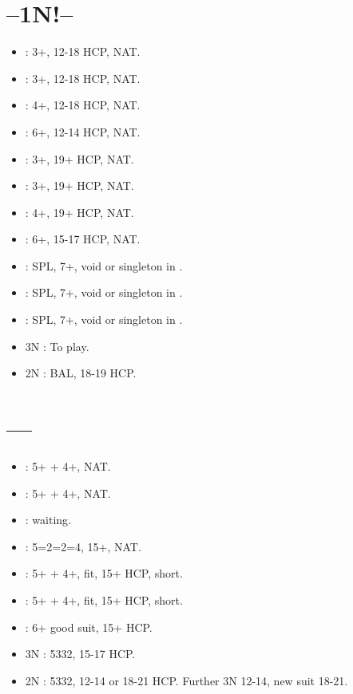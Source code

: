 \documentclass[12pt,twoside,a5paper]{report}%
\begin{document}
	\section*{--1N!--}
	\begin{itemize}
	\renewcommand{\labelitemi}{}
	\item {} : 3+\cl{}, 12-18 HCP, NAT.
	\item {} : 3+\di{}, 12-18 HCP, NAT.
	\item {} : 4+\he{}, 12-18 HCP, NAT.
	\item {} : 6+\sp{}, 12-14 HCP, NAT.
	\item {} : 3+\cl{}, 19+ HCP, NAT.
	\item {} : 3+\di{}, 19+ HCP, NAT.
	\item {} : 4+\he{}, 19+ HCP, NAT.
	\item {} : 6+\sp{}, 15-17 HCP, NAT.
	\item {} : SPL, 7+\sp{}, void or singleton in \cl{}.
	\item {} : SPL, 7+\sp{}, void or singleton in \di{}.
	\item {} : SPL, 7+\sp{}, void or singleton in \he{}.
	\item 3N : To play.
	\item 2N : BAL, 18-19 HCP.
	\end{itemize}

	\section*{----}
	\begin{itemize}
	\renewcommand{\labelitemi}{}
	\item {} : 5+\sp{} + 4+\di{}, NAT.
	\item {} : 5+\sp{} + 4+\he{}, NAT.
	\item {} : waiting.
	\item {} : 5=2=2=4, 15+, NAT.
	\item {} : 5+\sp{} + 4+\cl{}, fit, 15+ HCP, short\di{}.
	\item {} : 5+\sp{} + 4+\cl{}, fit, 15+ HCP, short\he{}.
	\item {} : 6+\sp{} good suit, 15+ HCP.
	\item 3N : 5332, 15-17 HCP.
	\item 2N : 5332, 12-14 or 18-21 HCP. Further 3N 12-14, new suit 18-21.
	\end{itemize}
\end{document}

